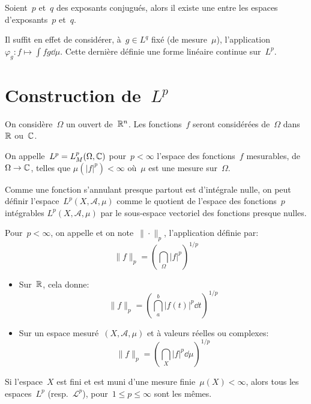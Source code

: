 \begin{theoreme}
Soient~$p$ et~$q$ des exposants conjugués, alors il existe une  entre les espaces d'exposants~$p$ et~$q$.
\end{theoreme}
Il suffit en effet de considérer, à~$g\in L^q$ fixé (de mesure~$\mu$), l'application~$\varphi_g: f\mapsto \int fg\dd\mu$. Cette dernière
définie une forme linéaire continue sur~$L^p$.

\medskip
\section{Construction de~$L^p$}

On considère~$\Omega$ un ouvert de~$\mathbb R^n$.
Les fonctions~$f$ seront considérées de~$\Omega$ dans~$\mathbb R$ ou~$\mathbb C$.

\medskip
On appelle~$\colorblue L^p \colorblack= L^p_M(\Omega,\CC)$ pour~$p<\infty$ l'espace des fonctions~$f$ mesurables, de~$\Omega \rightarrow \mathbb C$, telles que $\mu(|f|^p)<\infty$ où~$\mu$ est une mesure sur~$\Omega$.

\medskip
Comme une fonction s'annulant presque partout est d'intégrale nulle, on peut définir l'espace~$L^p(X, \mathcal{A}, \mu)$ comme le quotient de l'espace des fonctions~$p$ intégrables $L^p(X, \mathcal{A}, \mu)$ par le sous-espace vectoriel des fonctions presque nulles.


\medskip
\begin{definition}[Norme~$L^p$]
Pour~$p<\infty$, on appelle  et on note~$\|\cdot\|_p$, l'application définie par:
\begin{equation}\|f\|_p=\left(\dint_\Omega |f|^p\right)^{1/p}
\end{equation}
\end{definition}
\begin{itemize}
\item Sur~$\mathbb R$, cela donne:
\begin{equation}\|f\|_p=\left(\dint_a^b |f(t)|^p\dd t\right)^{1/p}\end{equation}
\item Sur un espace mesuré~$(X, \mathcal{A}, \mu)$ et à valeurs réelles ou complexes:
\begin{equation}\|f\|_p=\left(\dint_X |f|^p\dd\mu\right)^{1/p}\end{equation}
\end{itemize}
\medskip
\begin{theoreme}
Si l'espace~$X$ est fini et est muni d'une mesure finie~$\mu(X)<\infty$, alors tous les espaces~$L^p$ (resp.~$\mathcal{L}^p$), pour~$1\le p\le \infty$ sont les mêmes.
\end{theoreme}

